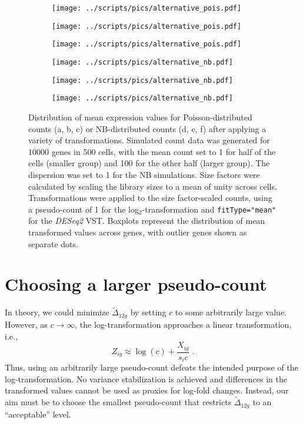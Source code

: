 \documentclass[10pt,letterpaper]{article}
\newcommand\code[1]{{\small\texttt{#1}}}
\begin{document}
\begin{figure}
\centering
\begin{subfigure}[b]{0.32\textwidth}
    \texttt{[image: ../scripts/pics/alternative\_pois.pdf]}
    \caption{}
\end{subfigure}
\begin{subfigure}[b]{0.32\textwidth}
    \texttt{[image: ../scripts/pics/alternative\_pois.pdf]}
    \caption{}
\end{subfigure}
\begin{subfigure}[b]{0.32\textwidth}
    \texttt{[image: ../scripts/pics/alternative\_pois.pdf]}
    \caption{}
\end{subfigure}
\begin{subfigure}[b]{0.32\textwidth}
    \texttt{[image: ../scripts/pics/alternative\_nb.pdf]}
    \caption{}
\end{subfigure}
\begin{subfigure}[b]{0.32\textwidth}
    \texttt{[image: ../scripts/pics/alternative\_nb.pdf]}
    \caption{}
\end{subfigure}
\begin{subfigure}[b]{0.32\textwidth}
    \texttt{[image: ../scripts/pics/alternative\_nb.pdf]}
    \caption{}
\end{subfigure}
\caption{Distribution of mean expression values for Poisson-distributed counts (a, b, c) or NB-distributed counts (d, e, f) after applying a variety of transformations.
Simulated count data was generated for 10000 genes in 500 cells, with the mean count set to 1 for half of the cells (smaller group) and 100 for the other half (larger group).
The dispersion was set to 1 for the NB simulations.
Size factors were calculated by scaling the library sizes to a mean of unity across cells.
Transformations were applied to the size factor-scaled counts, using a pseudo-count of 1 for the log$_2$-transformation and \code{fitType="mean"} for the \textit{DESeq2} VST.
Boxplots represent the distribution of mean transformed values across genes, with outlier genes shown as separate dots.
}
\label{fig:alttransform}
\end{figure}

\section{Choosing a larger pseudo-count}
In theory, we could minimize $\tilde\Delta_{12g}$ by setting $c$ to some arbitrarily large value.
However, as $c \to \infty$, the log-transformation approaches a linear transformation, i.e.,
\[
    Z_{ig} \approx \log(c) + \frac{X_{ig}}{s_i c} \;.
\]
Thus, using an arbitrarily large pseudo-count defeats the intended purpose of the log-transformation. 
No variance stabilization is achieved and differences in the transformed values cannot be used as proxies for log-fold changes. 
Instead, our aim must be to choose the smallest pseudo-count that restricts $\tilde\Delta_{12g}$ to an ``acceptable'' level.
\end{document}
